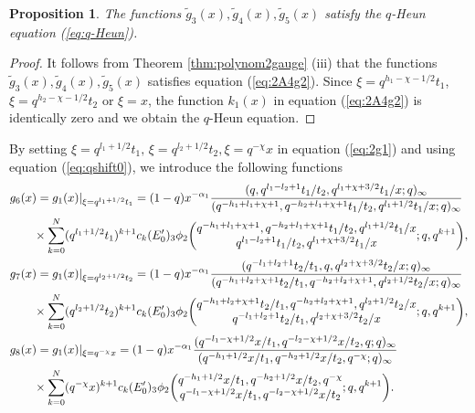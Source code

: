 \documentclass[12pt]{amsart}
\numberwithin{equation}{section}
\newtheorem{prop}[thm]{Proposition}
\theoremstyle{definition}
\theoremstyle{remark}
\begin{document}
\begin{prop} \label{prop:tg3tg4tg5}
The functions $\tilde{g}_3 (x) , \tilde{g}_{4} (x) , \tilde{g}_{5} (x) $ satisfy the $q$-Heun equation (\ref{eq:q-Heun}).
\end{prop}
\begin{proof}
It follows from Theorem \ref{thm:polynom2gauge} (iii) that the functions $\tilde{g}_3 (x) , \tilde{g}_{4} (x) , \tilde{g}_{5} (x) $ satisfies equation (\ref{eq:2A4g2}).
Since $\xi = q^{h_{1} - \chi - 1/2}t_{1}$, $\xi = q^{h_{2} - \chi - 1/2}t_{2}$ or $\xi = x$, the function $ k_{1}(x)$ in equation (\ref{eq:2A4g2}) is identically zero and we obtain the $q$-Heun equation.
\end{proof}
By setting $\xi = q^{l_{1} + 1/2}t_{1}, \, \xi = q^{l_{2} + 1/2}t_{2}, \xi = q^{-\chi}x$ in equation (\ref{eq:2g1}) and using equation (\ref{eq:qshift0}), we introduce the following functions
  \begin{align*}
    &g_{6}(x) = g_1 (x) | _{\xi = q^{l_{1} + 1/2}t_{1} } = (1 - q)x^{-\alpha_{1}}\frac{(q, q^{l_{1} - l_{2} + 1}t_{1}/t_{2}, q^{l_{1} + \chi + 3/2}t_{1}/x; q)_{\infty}}{(q^{-h_{1} + l_{1} + \chi + 1}, q^{-h_{2} + l_{1} + \chi + 1}t_{1}/t_{2}, q^{l_{1} + 1/2}t_{1}/x; q)_{\infty}} \\
    &\qquad \times \sum_{k = 0}^{N} (q^{l_{1} + 1/2}t_{1})^{k+1} c_k (E_{0}') {}_3\phi_2 \biggl( \begin{array}{@{}c@{}} q^{-h_{1} + l_{1} + \chi + 1}, q^{-h_{2} + l_{1} + \chi + 1}t_{1}/t_{2}, q^{l_{1} + 1/2}t_{1}/x \\
q^{l_{1} - l_{2} + 1}t_{1}/t_{2}, q^{l_{1} + \chi + 3/2}t_{1}/x \end{array} ;q,q^{k+1} \biggr), \\
    &g_{7}(x)  = g_1 (x) | _{\xi = q^{l_{2} + 1/2}t_{2} } =  (1 - q)x^{-\alpha_{1}}\frac{(q^{- l_{1} + l_{2} + 1}t_{2}/t_{1}, q, q^{l_{2} + \chi + 3/2}t_{2}/x; q)_{\infty}}{(q^{-h_{1} + l_{2} + \chi + 1}t_{2}/t_{1}, q^{-h_{2} + l_{2} + \chi + 1}, q^{l_{2} + 1/2}t_{2}/x; q)_{\infty}} \\
    &\qquad \times \sum_{k = 0}^{N} (q^{l_{2} + 1/2}t_{2})^{k+1}  c_k (E_{0}') {}_3\phi_2 \biggl( \begin{array}{@{}c@{}} q^{-h_{1} + l_{2} + \chi + 1}t_{2}/t_{1}, q^{-h_{2} + l_{2} + \chi + 1}, q^{l_{2} + 1/2}t_{2}/x \\
q^{- l_{1} + l_{2} + 1}t_{2}/t_{1}, q^{l_{2} + \chi + 3/2}t_{2}/x \end{array} ;q,q^{k+1} \biggr), \\
    &g_{8}(x)  = g_1 (x) | _{\xi = q^{-\chi}x } =  (1 - q)x^{-\alpha_{1}}\frac{(q^{-l_{1} - \chi + 1/2}x/t_{1}, q^{-l_{2} - \chi + 1/2}x/t_{2}, q; q)_{\infty}}{(q^{-h_{1} + 1/2}x/t_{1}, q^{-h_{2} + 1/2}x/t_{2}, q^{-\chi}; q)_{\infty}} \\
    &\qquad \times \sum_{k = 0}^{N} (q^{- \chi}x)^{k+1}  c_k (E_{0}') {}_3\phi_2 \biggl( \begin{array}{@{}c@{}} q^{-h_{1} + 1/2}x/t_{1}, q^{-h_{2} + 1/2}x/t_{2}, q^{-\chi} \\
q^{-l_{1} - \chi + 1/2}x/t_{1}, q^{-l_{2} - \chi + 1/2}x/t_{2} \end{array} ;q,q^{k+1} \biggr).
  \end{align*}
\end{document}
